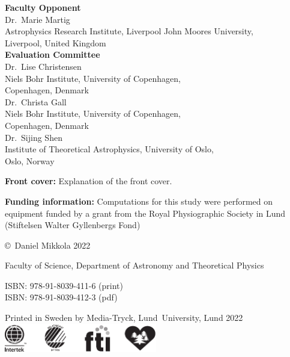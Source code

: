 \documentclass[E5,LUFonts]{lundphdthesis}
\begin{document}
\maketitle


\newpage
\begin{center}
	\textbf{Faculty Opponent} \\
	\vspace{1em}
	Dr.\ Marie Martig\\
	Astrophysics Research Institute, Liverpool John Moores University,\\
	Liverpool, United Kingdom\\
	\vspace{1.5em}
	\textbf{Evaluation Committee} \\
	\vspace{1em}
    Dr.\ Lise Christensen\\
    Niels Bohr Institute, University of Copenhagen,\\
    Copenhagen, Denmark\\
    \vspace{0.7em}
    Dr.\ Christa Gall\\
    Niels Bohr Institute, University of Copenhagen,\\
    Copenhagen, Denmark\\
	\vspace{0.7em}
    Dr.\ Sijing Shen\\
    Institute of Theoretical Astrophysics, University of Oslo,\\
    Oslo, Norway\\
\end{center}
\vfill

{\small\parindent0pt
\textbf{Front cover:} Explanation of the front cover.


\textbf{Funding information:} Computations for this study were performed on equipment funded by a grant from the Royal Physiographic Society in Lund (Stiftelsen Walter Gyllenbergs Fond)

\vspace{1em}
\copyright\, Daniel Mikkola 2022

\vspace{1em}
Faculty of Science, Department of Astronomy and Theoretical Physics

\vspace{1em}
ISBN: 978-91-8039-411-6 (print)\\ %
ISBN: 978-91-8039-412-3 (pdf) %

\vspace{1em}
Printed in Sweden by Media-Tryck, Lund~University, Lund 2022\\
\includegraphics[width=0.5\textwidth]{logo/miljoeloggor}
}
\end{document}
